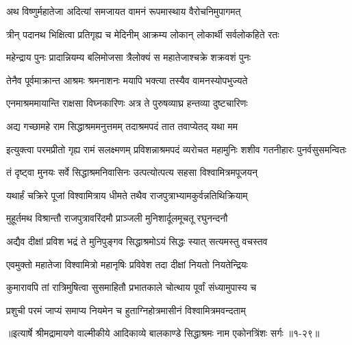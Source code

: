 \twolineshloka
{अथ विष्णुर्महातेजा अदित्यां समजायत}
{वामनं रूपमास्थाय वैरोचनिमुपागमत्} %

\twolineshloka
{त्रीन् पदानथ भिक्षित्वा प्रतिगृह्य च मेदिनीम्}
{आक्रम्य लोकान् लोकार्थी सर्वलोकहिते रतः} %

\twolineshloka
{महेन्द्राय पुनः प्रादान्नियम्य बलिमोजसा}
{त्रैलोक्यं स महातेजाश्चक्रे शक्रवशं पुनः} %

\twolineshloka
{तेनैव पूर्वमाक्रान्त आश्रमः श्रमनाशनः}
{मयापि भक्त्या तस्यैव वामनस्योपभुज्यते} %

\twolineshloka
{एनमाश्रममायान्ति राक्षसा विघ्नकारिणः}
{अत्र ते पुरुषव्याघ्र हन्तव्या दुष्टचारिणः} %

\twolineshloka
{अद्य गच्छामहे राम सिद्धाश्रममनुत्तमम्}
{तदाश्रमपदं तात तवाप्येतद् यथा मम} %

\threelineshloka
{इत्युक्त्वा परमप्रीतो गृह्य रामं सलक्ष्मणम्}
{प्रविशन्नाश्रमपदं व्यरोचत महामुनिः}
{शशीव गतनीहारः पुनर्वसुसमन्वितः} %

\twolineshloka
{तं दृष्ट्वा मुनयः सर्वे सिद्धाश्रमनिवासिनः}
{उत्पत्योत्पत्य सहसा विश्वामित्रमपूजयन्} %

\twolineshloka
{यथार्हं चक्रिरे पूजां विश्वामित्राय धीमते}
{तथैव राजपुत्राभ्यामकुर्वन्नतिथिक्रियाम्} %

\twolineshloka
{मुहूर्तमथ विश्रान्तौ राजपुत्रावरिंदमौ}
{प्राञ्जली मुनिशार्दूलमूचतू रघुनन्दनौ} %

\twolineshloka
{अद्यैव दीक्षां प्रविश भद्रं ते मुनिपुङ्गव}
{सिद्धाश्रमोऽयं सिद्धः स्यात् सत्यमस्तु वचस्तव} %

\twolineshloka
{एवमुक्तो महातेजा विश्वामित्रो महानृषिः}
{प्रविवेश तदा दीक्षां नियतो नियतेन्द्रियः} %

\twolineshloka
{कुमारावपि तां रात्रिमुषित्वा सुसमाहितौ}
{प्रभातकाले चोत्थाय पूर्वां संध्यामुपास्य च} %

\twolineshloka
{प्रशुची परमं जाप्यं समाप्य नियमेन च}
{हुताग्निहोत्रमासीनं विश्वामित्रमवन्दताम्} %


॥इत्यार्षे श्रीमद्रामायणे वाल्मीकीये आदिकाव्ये बालकाण्डे सिद्धाश्रमः नाम एकोनत्रिंशः सर्गः ॥१-२९॥

